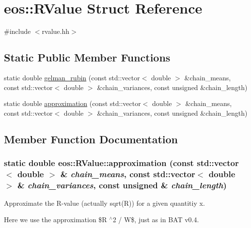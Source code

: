 \hypertarget{structeos_1_1RValue}{
\section{eos::RValue Struct Reference}
\label{structeos_1_1RValue}
}


{\ttfamily \#include $<$rvalue.hh$>$}\subsection*{Static Public Member Functions}
\begin{DoxyCompactItemize}
\item 
static double \hyperlink{structeos_1_1RValue_ac18b9cf1272e22d614f54fddc82d5072}{gelman\_\-rubin} (const std::vector$<$ double $>$ \&chain\_\-means, const std::vector$<$ double $>$ \&chain\_\-variances, const unsigned \&chain\_\-length)
\item 
static double \hyperlink{structeos_1_1RValue_a1ef9238e0cae5fbfe5e9271f8012f2e8}{approximation} (const std::vector$<$ double $>$ \&chain\_\-means, const std::vector$<$ double $>$ \&chain\_\-variances, const unsigned \&chain\_\-length)
\end{DoxyCompactItemize}


\subsection{Member Function Documentation}
\hypertarget{structeos_1_1RValue_a1ef9238e0cae5fbfe5e9271f8012f2e8}{
\subsubsection[{approximation}]{\setlength{\rightskip}{0pt plus 5cm}static double eos::RValue::approximation (const std::vector$<$ double $>$ \& {\em chain\_\-means}, \/  const std::vector$<$ double $>$ \& {\em chain\_\-variances}, \/  const unsigned \& {\em chain\_\-length})}}
\label{structeos_1_1RValue_a1ef9238e0cae5fbfe5e9271f8012f2e8}
Approximate the R-\/value (actually sqrt(R)) for a given quantitiy x.

Here we use the approximation \$R  $^\wedge$2 / W\$, just as in BAT v0.4.


